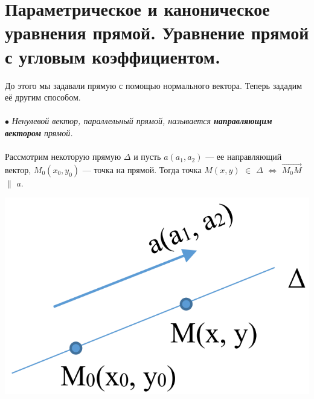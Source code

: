 \section{Параметрическое и каноническое уравнения прямой. Уравнение прямой с угловым коэффициентом.}
До этого мы задавали прямую с помощью нормального вектора. Теперь зададим её другим способом.\\\\
$\bullet$ \textit{Ненулевой вектор, параллельный прямой, называется \textbf{направляющим вектором} прямой.} \\\\
Рассмотрим некоторую прямую $\Delta$ и пусть $a(a_1, a_2)$ --- ее направляющий вектор, $M_0 (x_0, y_0)$ --- точка на прямой. Тогда точка $M (x, y)$ $\in$ $\Delta$ $\Longleftrightarrow$ $\overrightarrow{M_0 M}$ $\parallel$ $a$.
\begin{center}
	\includegraphics[scale=0.3]{images/line4_3.png}
\end{center}
